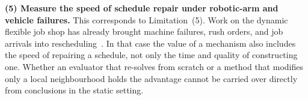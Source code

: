 \textbf{(5) Measure the speed of schedule repair under robotic-arm and vehicle failures.}
This corresponds to Limitation~(5). Work on the dynamic flexible job shop has already brought machine failures, rush orders, and job arrivals into rescheduling~\cite{gui2023dynamic,xiong2024dynamic,dauzereperes2024fjsp}.
In that case the value of a mechanism also includes the speed of repairing a schedule, not only the time and quality of constructing one. Whether an evaluator that re-solves from scratch or a method that modifies only a local neighbourhood holds the advantage cannot be carried over directly from conclusions in the static setting.









\endinput
